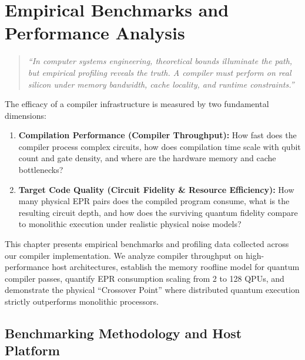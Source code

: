 \chapter{Empirical Benchmarks and Performance Analysis}
\label{ch:empirical_benchmarks}

\begin{quote}
\textit{``In computer systems engineering, theoretical bounds illuminate the path, but empirical profiling reveals the truth. A compiler must perform on real silicon under memory bandwidth, cache locality, and runtime constraints.''}
\end{quote}

The efficacy of a compiler infrastructure is measured by two fundamental dimensions:
\begin{enumerate}
    \item \textbf{Compilation Performance (Compiler Throughput):} How fast does the compiler process complex circuits, how does compilation time scale with qubit count and gate density, and where are the hardware memory and cache bottlenecks?
    \item \textbf{Target Code Quality (Circuit Fidelity \& Resource Efficiency):} How many physical EPR pairs does the compiled program consume, what is the resulting circuit depth, and how does the surviving quantum fidelity compare to monolithic execution under realistic physical noise models?
\end{enumerate}

This chapter presents empirical benchmarks and profiling data collected across our compiler implementation. We analyze compiler throughput on high-performance host architectures, establish the memory roofline model for quantum compiler passes, quantify EPR consumption scaling from 2 to 128 QPUs, and demonstrate the physical ``Crossover Point'' where distributed quantum execution strictly outperforms monolithic processors.

\section{Benchmarking Methodology and Host Platform}
\label{sec:benchmark_methodology}

